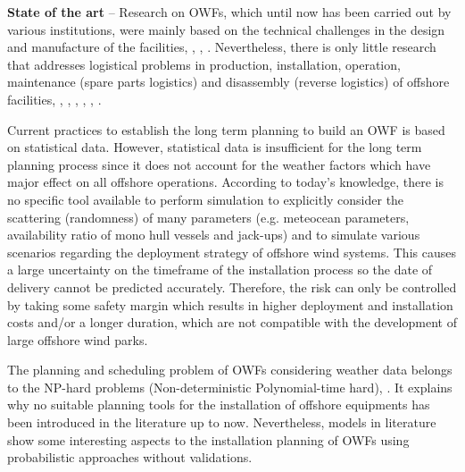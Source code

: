 \textbf{State of the art} --
Research on OWFs, which until now has been carried out by various institutions, were mainly based on the technical challenges in the design and manufacture of the facilities, \cite{Miller2013}, \cite{SerranoGonzalez2014}, \cite{Perveen2014}. Nevertheless, there is only little research that addresses logistical problems in production, installation, operation, maintenance (spare parts logistics) and disassembly (reverse logistics) of offshore facilities, \cite{Scholz2010}, \cite{Lange2012}, \cite{COMPIT11}, \cite{COMPIT12}, \cite{aitsimulation}, \cite{thalji2012}.

Current practices to establish the long term planning to build an OWF is based on statistical data. However, statistical data is insufficient for the long term planning process since it does not account for the weather factors which have major effect on all offshore operations. According to today’s knowledge, there is no specific tool available to perform simulation to explicitly consider the scattering (randomness) of many parameters (e.g. meteocean parameters, availability ratio of mono hull vessels and jack-ups) and to simulate various scenarios regarding the deployment strategy of offshore wind systems. This causes a large uncertainty on the timeframe of the installation process so the date of delivery cannot be predicted accurately. Therefore, the risk can only be controlled by taking some safety margin which results in higher deployment and installation costs and/or a longer duration, which are not compatible with the development of large offshore wind parks.

The planning and scheduling problem of OWFs considering weather data belongs to the NP-hard problems (Non-deterministic Polynomial-time hard), \cite{leeuwen1990}. It explains why no suitable planning tools for the installation of offshore equipments has been introduced in the literature up to now. Nevertheless, models in literature show some interesting aspects to the installation planning of OWFs using probabilistic approaches without validations. 

